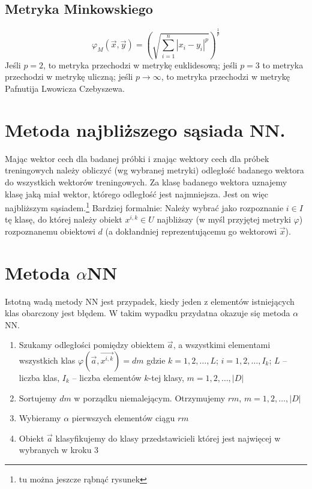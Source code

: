 \documentclass[a4paper,10pt]{article}
\begin{document}
\subsection{Metryka Minkowskiego}
\begin{equation}
  \varphi_M(\overrightarrow{x}, \overrightarrow{y}) = \left(\sqrt{\sum_{i = 1}^n |x_i - y_i|^p}\right)^{\frac{1}{p}}
\end{equation}
Jeśli $p = 2$, to metryka przechodzi w metrykę euklidesową; jeśli $p = 3$ to metryka przechodzi w metrykę uliczną; jeśli $p \rightarrow \infty$, to metryka przechodzi w metrykę Pafnutija Lwowicza Czebyszewa.

\section{Metoda najbliższego sąsiada NN.}
Mając wektor cech dla badanej próbki i znając wektory cech dla próbek treningowych należy obliczyć (wg wybranej metryki) odległość badanego wektora do wszystkich wektorów treningowych. Za klasę badanego wektora uznajemy klasę jaką miał wektor, którego odległość jest najmniejsza. Jest on więc najbliższym sąsiadem.\footnote{tu można jeszcze rąbnąć rysunek}
Bardziej formalnie: Należy wybrać jako rozpoznanie $i \in I$ tę klasę, do której należy obiekt $x^{i,k} \in U$ najbliższy (w myśl przyjętej metryki $\varphi$) rozpoznanemu obiektowi $d$ (a dokłandniej reprezentującemu go wektorowi $\overrightarrow{x}$).

\section{Metoda $\alpha$NN}
Istotną wadą metody NN jest przypadek, kiedy jeden z elementów istniejących klas obarczony jest błędem. W takim wypadku przydatna okazuje się metoda $\alpha$NN.
\begin{enumerate}
\item Szukamy odległości pomiędzy obiektem $\overrightarrow{a}$, a wszystkimi elementami wszystkich klas $\varphi(\overrightarrow{a},\overrightarrow{x^{i,k}})=dm$ gdzie $k = 1, 2, \ldots, L$; $i = 1,2, \ldots, I_k$; $L$ – liczba klas, $I_k$ – liczba elementów $k$-tej klasy, $m=1,2,\ldots,|D|$
\item Sortujemy $dm$ w porządku niemalejącym. Otrzymujemy $rm$, $m = 1,2,\ldots, |D|$
\item Wybieramy $\alpha$ pierwszych elementów ciągu $rm$
\item Obiekt $\overrightarrow{a}$ klasyfikujemy do klasy przedstawicieli której jest najwięcej w wybranych w kroku 3
\end{enumerate}
\end{document}
